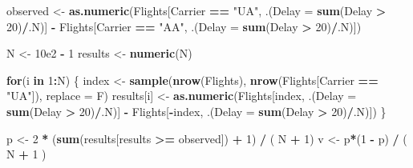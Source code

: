 \documentclass[
  12pt,
]{report}
\newenvironment{Shaded}{\begin{snugshade}}{\end{snugshade}}
\newcommand{\ControlFlowTok}[1]{\textcolor[rgb]{0.13,0.29,0.53}{\textbf{#1}}}
\newcommand{\DataTypeTok}[1]{\textcolor[rgb]{0.13,0.29,0.53}{#1}}
\newcommand{\DecValTok}[1]{\textcolor[rgb]{0.00,0.00,0.81}{#1}}
\newcommand{\FloatTok}[1]{\textcolor[rgb]{0.00,0.00,0.81}{#1}}
\newcommand{\KeywordTok}[1]{\textcolor[rgb]{0.13,0.29,0.53}{\textbf{#1}}}
\newcommand{\NormalTok}[1]{#1}
\newcommand{\OperatorTok}[1]{\textcolor[rgb]{0.81,0.36,0.00}{\textbf{#1}}}
\newcommand{\StringTok}[1]{\textcolor[rgb]{0.31,0.60,0.02}{#1}}
\begin{document}
\begin{Shaded}
\begin{Highlighting}[]
\NormalTok{observed <-}\StringTok{ }\KeywordTok{as.numeric}\NormalTok{(Flights[Carrier }\OperatorTok{==}\StringTok{ "UA"}\NormalTok{, .(}\DataTypeTok{Delay =} \KeywordTok{sum}\NormalTok{(Delay }\OperatorTok{>}\StringTok{ }\DecValTok{20}\NormalTok{)}\OperatorTok{/}\NormalTok{.N)] }\OperatorTok{-}\StringTok{ }\NormalTok{Flights[Carrier }\OperatorTok{==}\StringTok{ "AA"}\NormalTok{, .(}\DataTypeTok{Delay =} \KeywordTok{sum}\NormalTok{(Delay }\OperatorTok{>}\StringTok{ }\DecValTok{20}\NormalTok{)}\OperatorTok{/}\NormalTok{.N)])}

\NormalTok{N <-}\StringTok{ }\FloatTok{10e2} \OperatorTok{-}\StringTok{ }\DecValTok{1}
\NormalTok{results <-}\StringTok{ }\KeywordTok{numeric}\NormalTok{(N)}

\ControlFlowTok{for}\NormalTok{(i }\ControlFlowTok{in} \DecValTok{1}\OperatorTok{:}\NormalTok{N)}
\NormalTok{\{}
\NormalTok{   index <-}\StringTok{ }\KeywordTok{sample}\NormalTok{(}\KeywordTok{nrow}\NormalTok{(Flights), }\KeywordTok{nrow}\NormalTok{(Flights[Carrier }\OperatorTok{==}\StringTok{ "UA"}\NormalTok{]), }\DataTypeTok{replace =}\NormalTok{ F)}
\NormalTok{   results[i] <-}\StringTok{ }\KeywordTok{as.numeric}\NormalTok{(Flights[index, .(}\DataTypeTok{Delay =} \KeywordTok{sum}\NormalTok{(Delay }\OperatorTok{>}\StringTok{ }\DecValTok{20}\NormalTok{)}\OperatorTok{/}\NormalTok{.N)] }\OperatorTok{-}\StringTok{ }\NormalTok{Flights[}\OperatorTok{-}\NormalTok{index, .(}\DataTypeTok{Delay =} \KeywordTok{sum}\NormalTok{(Delay }\OperatorTok{>}\StringTok{ }\DecValTok{20}\NormalTok{)}\OperatorTok{/}\NormalTok{.N)])}
\NormalTok{\}}

\NormalTok{p <-}\StringTok{ }\DecValTok{2} \OperatorTok{*}\StringTok{ }\NormalTok{(}\KeywordTok{sum}\NormalTok{(results[results }\OperatorTok{>=}\StringTok{ }\NormalTok{observed]) }\OperatorTok{+}\StringTok{ }\DecValTok{1}\NormalTok{) }\OperatorTok{/}\StringTok{ }\NormalTok{( N }\OperatorTok{+}\StringTok{ }\DecValTok{1}\NormalTok{)}
\NormalTok{v <-}\StringTok{ }\NormalTok{p}\OperatorTok{*}\NormalTok{(}\DecValTok{1} \OperatorTok{-}\StringTok{ }\NormalTok{p) }\OperatorTok{/}\StringTok{ }\NormalTok{( N }\OperatorTok{+}\StringTok{ }\DecValTok{1}\NormalTok{ )}


\end{Highlighting}
\end{Shaded}
\end{document}
